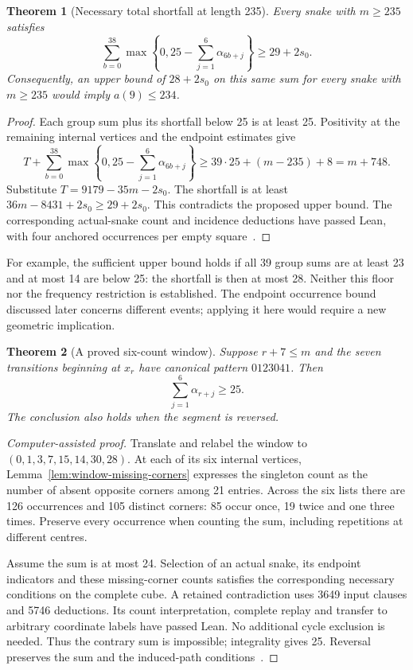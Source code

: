 \documentclass[11pt,a4paper]{article}
\newtheorem{theorem}{Theorem}[section]
\theoremstyle{definition}
\theoremstyle{remark}
\begin{document}
\begin{theorem}[Necessary total shortfall at length 235]\label{thm:six-shortfall}
Every snake with $m\ge235$ satisfies
\begin{equation}\label{eq:six-shortfall}
\sum_{b=0}^{38}\max\left\{0,25-\sum_{j=1}^{6}\alpha_{6b+j}\right\}
\ge29+2s_0.
\end{equation}
Consequently, an upper bound of $28+2s_0$ on this same sum for every snake
with $m\ge235$ would imply $a(9)\le234$.
\end{theorem}
\begin{proof}
Each group sum plus its shortfall below 25 is at least 25. Positivity at
the remaining internal vertices and the endpoint estimates give
\[
T+\sum_{b=0}^{38}\max\left\{0,25-\sum_{j=1}^{6}\alpha_{6b+j}\right\}
\ge39\cdot25+(m-235)+8=m+748.
\]
Substitute $T=9179-35m-2s_0$. The shortfall is at least
$36m-8431+2s_0\ge29+2s_0$. This contradicts the proposed upper bound.
The corresponding actual-snake count and incidence deductions have passed
Lean, with four anchored occurrences per empty square~\cite{criticalsixarchive}.
\end{proof}
For example, the sufficient upper bound holds if all 39 group sums are at
least 23 and at most 14 are below 25: the shortfall is then at most 28.
Neither this floor nor the frequency restriction is established. The endpoint
occurrence bound discussed later concerns different events; applying it here
would require a new geometric implication.

\begin{theorem}[A proved six-count window]\label{thm:six-0123041}
Suppose $r+7\le m$ and the seven transitions beginning at $x_r$ have canonical
pattern $0123041$. Then
\[
\sum_{j=1}^{6}\alpha_{r+j}\ge25.
\]
The conclusion also holds when the segment is reversed.
\end{theorem}
\begin{proof}[Computer-assisted proof]
Translate and relabel the window to $(0,1,3,7,15,14,30,28)$. At each of its
six internal vertices, Lemma~\ref{lem:window-missing-corners} expresses the
singleton count as the number of absent opposite corners among 21 entries.
Across the six lists there are 126 occurrences and 105 distinct corners:
85 occur once, 19 twice and one three times. Preserve every occurrence when
counting the sum, including repetitions at different centres.

Assume the sum is at most 24. Selection of an actual snake, its endpoint
indicators and these missing-corner counts satisfies the corresponding
necessary conditions on the complete cube. A retained contradiction uses
3649 input clauses and 5746 deductions. Its count interpretation, complete
replay and transfer to arbitrary coordinate labels have passed Lean. No
additional cycle exclusion is needed. Thus the contrary sum is impossible;
integrality gives 25. Reversal preserves the sum and the induced-path
conditions~\cite{uniformsixarchive}.
\end{proof}
\end{document}
